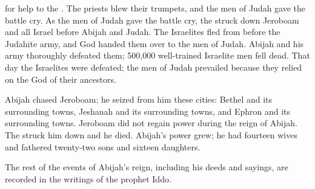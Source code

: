 {for help to the
{}. The priests
blew
their trumpets,
and the men
of Judah
gave the battle
cry.
As the men
of Judah
gave
the battle cry,
the
{} struck
down Jeroboam
and all
Israel
before
Abijah
and Judah.
The Israelites
fled
from before
the Judahite
army, and God
handed
them over to the men of Judah.
Abijah
and his army
thoroughly
defeated
them; 500,000
well-trained
Israelite
men
fell
dead.
That day
the Israelites
were defeated;
the men
of Judah
prevailed
because
they relied
on
the {}
God
of their ancestors.
\par }{\PP {}Abijah
chased
Jeroboam;
he seized
from
him these cities: Bethel
and its surrounding towns,
Jeshanah
and its surrounding towns,
and Ephron
and its surrounding towns.
Jeroboam
did not
regain
power during
the reign of Abijah.
The
{}
struck
him down and he died.
Abijah’s
power
grew;
he had fourteen
wives
and fathered
twenty-two
sons
and sixteen
daughters.
\par }{\PP {}The rest
of the events of Abijah’s
reign, including his deeds
and sayings,
are recorded
in the writings
of the prophet
Iddo.

\par }
